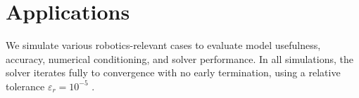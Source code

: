 \section{Applications}
\label{sec:applications}

We simulate various robotics-relevant cases to evaluate model usefulness,
accuracy, numerical conditioning, and solver performance. In all simulations,
the solver iterates fully to convergence with no early termination, using a
relative tolerance $\varepsilon_r=10^{-5}$ \cite{bib:castro2022unconstrained}.










